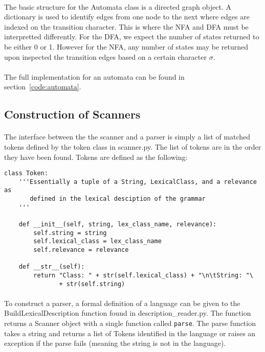 \documentclass{article}
\begin{document}
\paragraph{} The basic structure for the Automata class is a directed
graph object. A dictionary is used to identify edges from one node to
the next where edges are indexed on the transition character. This is
where the NFA and DFA must be interpretted differently. For the DFA,
we expect the number of states returned to be either 0 or 1. However
for the NFA, any number of states may be returned upon inspected the
transition edges based on a certain character $\sigma$.

\paragraph{} The full implementation for an automata can be found in section~\ref{code:automata}.

\subsection{Construction of Scanners}
\paragraph{} The interface between the the scanner and a parser is simply a list of matched tokens defined by the token class in scanner.py. The list of tokens are in the order they have been found. Tokens are defined as the following:

\begin{verbatim}
class Token:
    '''Essentially a tuple of a String, LexicalClass, and a relevance as
       defined in the lexical desciption of the grammar
    '''

    def __init__(self, string, lex_class_name, relevance):
        self.string = string
        self.lexical_class = lex_class_name
        self.relevance = relevance

    def __str__(self):
        return "Class: " + str(self.lexical_class) + "\n\tString: "\
               + str(self.string)
\end{verbatim}

\paragraph{} To construct a parser, a formal definition of a language can be
given to the BuildLexicalDescription function found in
description\_reader.py. The function returns a Scanner object with a
single function called \verb|parse|. The parse function takes a string
and returns a list of Tokens identified in the language or raises an
exception if the parse fails (meaning the string is not in the language).
\end{document}
